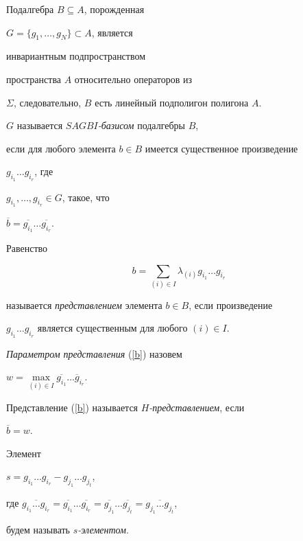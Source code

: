 Подалгебра $B\subseteq A$, порожденная


$G=\lbrace g_{1},\dotsc,g_{N}\rbrace\subset A$, является


инвариантным подпространством


пространства $A$ относительно операторов из


$\Sigma$, следовательно, $B$ есть линейный подполигон полигона $A$.





\begin{defn}


$G$ называется {\it $SAGBI$-базисом} подалгебры $B$,


если для любого элемента $b\in B$ имеется существенное произведение


$g_{i_{1}}\dotsc g_{i_{r}}$, где 


$g_{i_{1}},\dotsc,g_{i_{r}}\in G$, такое, что


$\overline{b}=\overline{g_{i_{1}}}\dotsc\overline{g_{i_{r}}}$.


\end{defn}





\begin{defn}


Равенство


\begin{equation} \label{b}


b=\sum\limits_{(i)\in I}\lambda_{(i)}g_{i_{1}}\dotsc g_{i_{r}}


\end{equation}


называется {\it представлением} элемента $b\in B$, если произведение


$g_{i_{1}}\dotsc g_{i_{r}}$ является существенным для любого $(i)\in I$.


{\it Параметром представления}  (\ref{b}) назовем


$w=\max\limits_{(i)\in I}\overline{g_{i_{1}}}\dotsc\overline g_{i_{r}}$.


Представление (\ref{b}) называется {\it $H$-представлением}, если


$\overline{b}=w$.


\end{defn}





\begin{defn}


Элемент


$s=g_{i_{1}}\dotsc g_{i_{r}}-g_{j_{1}}\dotsc g_{j_{t}}$,


где $\overline{g_{i_{1}}\dotsc g_{i_{r}}}=


\overline{g_{i_{1}}}\dotsc\overline{g_{i_{r}}}=


\overline{g_{j_{1}}}\dotsc\overline{g_{j_{t}}}=


\overline{g_{j_{1}}\dotsc g_{j_{t}}}$,


будем называть {\it $s$-элементом}.


\end{defn}





